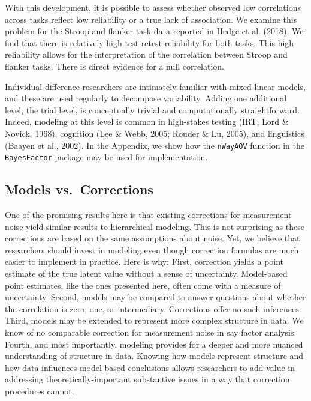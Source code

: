 \documentclass[english,man]{apa6}
\theoremstyle{definition}
\theoremstyle{definition}
\theoremstyle{definition}
\theoremstyle{remark}
\begin{document}
With this development, it is possible to assess whether observed low
correlations across tasks reflect low reliability or a true lack of
association. We examine this problem for the Stroop and flanker task
data reported in Hedge et al. (2018). We find that there is relatively
high test-retest reliability for both tasks. This high reliability
allows for the interpretation of the correlation between Stroop and
flanker tasks. There is direct evidence for a null correlation.

Individual-difference researchers are intimately familiar with mixed
linear models, and these are used regularly to decompose variability.
Adding one additional level, the trial level, is conceptually trivial
and computationally straightforward. Indeed, modeling at this level is
common in high-stakes testing (IRT, Lord \& Novick, 1968), cognition
(Lee \& Webb, 2005; Rouder \& Lu, 2005), and linguistics (Baayen et al.,
2002). In the Appendix, we show how the \texttt{nWayAOV} function in the
\texttt{BayesFactor} package may be used for implementation.

\subsection{Models vs.~Corrections}\label{models-vs.corrections}

One of the promising results here is that existing corrections for
measurement noise yield similar results to hierarchical modeling. This
is not surprising as these corrections are based on the same assumptions
about noise. Yet, we believe that researchers should invest in modeling
even though correction formulas are much easier to implement in
practice. Here is why: First, correction yields a point estimate of the
true latent value without a sense of uncertainty. Model-based point
estimates, like the ones presented here, often come with a measure of
uncertainty. Second, models may be compared to answer questions about
whether the correlation is zero, one, or intermediary. Corrections offer
no such inferences. Third, models may be extended to represent more
complex structure in data. We know of no comparable correction for
measurement noise in say factor analysis. Fourth, and most importantly,
modeling provides for a deeper and more nuanced understanding of
structure in data. Knowing how models represent structure and how data
influences model-based conclusions allows researchers to add value in
addressing theoretically-important substantive issues in a way that
correction procedures cannot.
\end{document}

